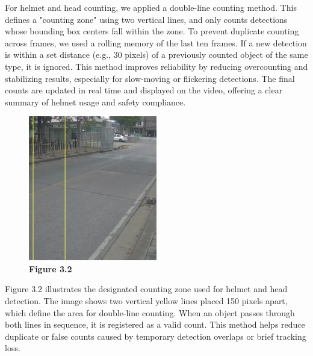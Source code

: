	
	\noindent\hspace{2.5em}For helmet and head counting, we applied a double-line counting method. This defines a "counting zone" using two vertical lines, and only counts detections whose bounding box centers fall within the zone. To prevent duplicate counting across frames, we used a rolling memory of the last ten frames. If a new detection is within a set distance (e.g., 30 pixels) of a previously counted object of the same type, it is ignored.
	\newline
	This method improves reliability by reducing overcounting and stabilizing results, especially for slow-moving or flickering detections. The final counts are updated in real time and displayed on the video, offering a clear summary of helmet usage and safety compliance.
	\begin{figure}[H] %
		\centering
		\includegraphics[width=0.5\textwidth]{headhel1.png}
		\vspace{0.5em}
		\caption*{\textbf{Figure 3.2}}
	\end{figure}
	\hfill

	\noindent\hspace{2.5em}Figure 3.2 illustrates the designated counting zone used for helmet and head detection. The image shows two vertical yellow lines placed 150 pixels apart, which define the area for double-line counting. When an object passes through both lines in sequence, it is registered as a valid count. This method helps reduce duplicate or false counts caused by temporary detection overlaps or brief tracking loss.
	
